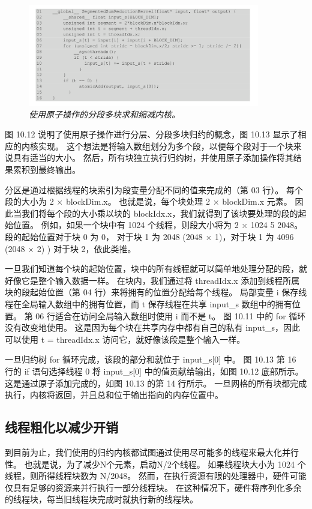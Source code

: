 \begin{figure}[H]
	\centering
	\includegraphics[width=0.9\textwidth]{figs/F10.13.png}
	\caption{\textit{使用原子操作的分段多块求和缩减内核。}}
\end{figure}

图 10.12 说明了使用原子操作进行分层、分段多块归约的概念，图 10.13 显示了相应的内核实现。 
这个想法是将输入数组划分为多个段，以便每个段对于一个块来说具有适当的大小。 
然后，所有块独立执行归约树，并使用原子添加操作将其结果累积到最终输出。

分区是通过根据线程的块索引为段变量分配不同的值来完成的（第 03 行）。 每个段的大小为 2 × blockDim.x。 
也就是说，每个块处理 2 × blockDim.x 元素。 
因此当我们将每个段的大小乘以块的 blockIdx.x，我们就得到了该块要处理的段的起始位置。 
例如，如果一个块中有 1024 个线程，则段大小将为 2 × 1024 5 2048。段的起始位置对于块 0 为 0，
对于块 1 为 2048 (2048 × 1)，对于块 1 为 4096 (2048 × 2) ) 对于块 2，依此类推。

一旦我们知道每个块的起始位置，块中的所有线程就可以简单地处理分配的段，就好像它是整个输入数据一样。 
在块内，我们通过将 threadIdx.x 添加到线程所属块的段起始位置（第 04 行）来将拥有的位置分配给每个线程。 
局部变量 i 保存线程在全局输入数组中的拥有位置，而 t 保存线程在共享 input\_s 数组中的拥有位置。 
第 06 行适合在访问全局输入数组时使用 i 而不是 t。 图 10.11 中的 for 循环没有改变地使用。 
这是因为每个块在共享内存中都有自己的私有 input\_s，因此可以使用 t = threadIdx.x 访问它，就好像该段是整个输入一样。

一旦归约树 for 循环完成，该段的部分和就位于 input\_s[0] 中。 
图 10.13 第 16 行的 if 语句选择线程 0 将 input\_s[0] 中的值贡献给输出，如图 10.12 底部所示。 
这是通过原子添加完成的，如图 10.13 的第 14 行所示。 
一旦网格的所有块都完成执行，内核将返回，并且总和位于输出指向的内存位置中。

\subsection{线程粗化以减少开销}
到目前为止，我们使用的归约内核都试图通过使用尽可能多的线程来最大化并行性。 
也就是说，为了减少N个元素，启动N/2个线程。 如果线程块大小为 1024 个线程，则所得线程块数为 N/2048。 
然而，在执行资源有限的处理器中，硬件可能仅具有足够的资源来并行执行一部分线程块。 
在这种情况下，硬件将序列化多余的线程块，每当旧线程块完成时就执行新的线程块。

